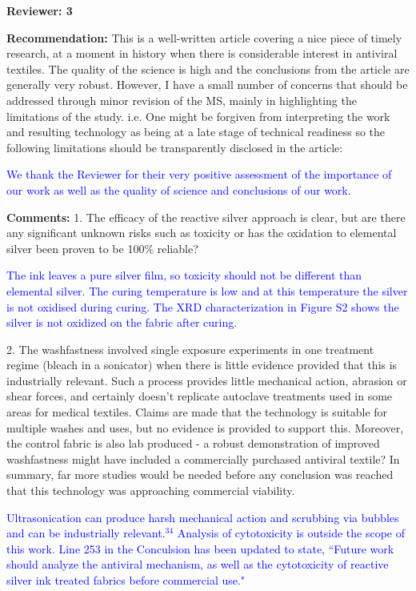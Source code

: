 \documentclass[12pt]{letter}
\newcommand{\blue}[1]{\textcolor{blue}{#1}} %
\begin{document}
\newpage
\textbf{Reviewer: 3}

\textbf{Recommendation:} This is a well-written article covering a nice piece of timely research, at a moment in history when there is considerable interest in antiviral textiles. The quality of the science is high and the conclusions from the article are generally very robust. However, I have a small number of concerns that should be addressed through minor revision of the MS, mainly in highlighting the limitations of the study. i.e. One might be forgiven from interpreting the work and resulting technology as being at a late stage of technical readiness so the following limitations should be transparently disclosed in the article:

\blue{We thank the Reviewer for their very positive assessment of the importance of our work as well as the quality of science and conclusions of our work.  }

\textbf{Comments:} 
1. The efficacy of the reactive silver approach is clear, but are there any significant unknown risks such as toxicity or has the oxidation to elemental silver been proven to be 100\% reliable?

\blue{The ink leaves a pure silver film, so toxicity should not be different than elemental silver. The curing temperature is low and at this temperature the silver is not oxidised during curing. The XRD characterization in Figure S2 shows the silver is not oxidized on the fabric after curing. }

2. The washfastness involved single exposure experiments in one treatment regime (bleach in a sonicator) when there is little evidence provided that this is industrially relevant. Such a process provides little mechanical action, abrasion or shear forces, and certainly doesn't replicate autoclave treatments used in some areas for medical textiles. Claims are made that the technology is suitable for multiple washes and uses, but no evidence is provided to support this. Moreover, the control fabric is also lab produced - a robust demonstration of improved washfastness might have included a commercially purchased antiviral textile? In summary, far more studies would be needed before any conclusion was reached that this technology was approaching commercial viability.

\blue{Ultrasonication can produce harsh mechanical action and scrubbing via bubbles and can be industrially relevant.$^{34}$ Analysis of cytotoxicity is outside the scope of this work.  Line 253 in the Conculsion has been updated to state, 
``Future work should analyze the antiviral mechanism, as well as the cytotoxicity of reactive silver ink treated fabrics before
commercial use."}
\end{document}
